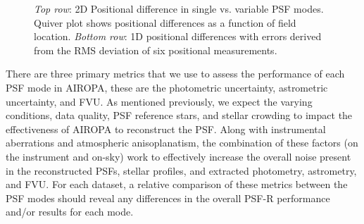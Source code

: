 \documentclass[]{spie}  %
\begin{document}
\begin{figure}[!h]
 \caption{\footnotesize \textit{Top row}: 2D Positional difference in single vs. variable PSF modes. Quiver plot shows positional differences as a function of field location. \textit{Bottom row}: 1D positional differences with errors derived from the RMS deviation of six positional measurements.} \label{fig:gc-gq-astrom}
\end{figure}

\indent There are three primary metrics that we use to assess the performance of each PSF mode in AIROPA, these are the photometric uncertainty, astrometric uncertainty, and FVU. As mentioned previously, we expect the varying conditions, data quality, PSF reference stars, and stellar crowding to impact the effectiveness of AIROPA to reconstruct the PSF. Along with instrumental aberrations and atmospheric anisoplanatism, the combination of these factors (on the instrument and on-sky) work to effectively increase the overall noise present in the reconstructed PSFs, stellar profiles, and extracted photometry, astrometry, and FVU. For each dataset, a relative comparison of these metrics between the PSF modes should reveal any differences in the overall PSF-R performance and/or results for each mode.
\end{document}

